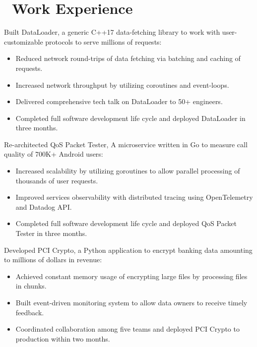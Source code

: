 \documentclass{resume}
\begin{document}
\section{\faUsers\ Work Experience}
 {
  \fontsize{10.5pt}{2}\selectfont
  Built DataLoader, a generic C++17 data-fetching library to work with user-customizable protocols to serve millions of requests:
  \begin{itemize}
    \item {Reduced network round-trips of data fetching via batching and caching of requests.}
    \item {Increased network throughput by utilizing coroutines and event-loops.}
    \item {Delivered comprehensive tech talk on DataLoader to 50+ engineers.}
    \item {Completed full software development life cycle and deployed DataLoader in three months.}
  \end{itemize}

  Re-architected QoS Packet Tester, A microservice written in Go to measure call quality of 700K+ Android users:
  \begin{itemize}
    \item {Increased scalability by utilizing goroutines to allow parallel processing of thousands of user requests.}
    \item {Improved services observability with distributed tracing using OpenTelemetry and Datadog API.}
    \item {Completed full software development life cycle and deployed QoS Packet Tester in three months.}
  \end{itemize}

  Developed PCI Crypto, a Python application to encrypt banking data amounting to millions of dollars in revenue:
  \begin{itemize}
    \item {Achieved constant memory usage of encrypting large files by processing files in chunks.}
    \item {Built event-driven monitoring system to allow data owners to receive timely feedback.}
    \item {Coordinated collaboration among five teams and deployed PCI Crypto to production within two months.}
  \end{itemize}

}
\end{document}
